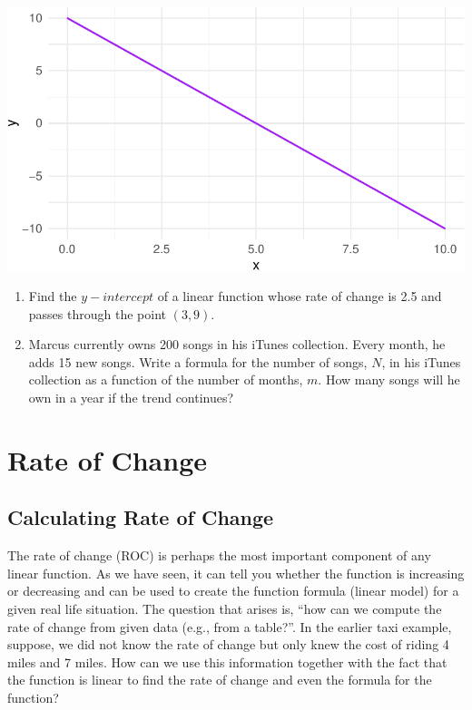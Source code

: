 \documentclass[
  letterpaper,
  DIV=11,
  numbers=noendperiod]{scrreprt}
\begin{document}
\includegraphics{Intro_LF_files/figure-pdf/unnamed-chunk-2-1.pdf}

\begin{enumerate}
\def\labelenumi{\arabic{enumi}.}
\setcounter{enumi}{5}
\item
  Find the \(y-intercept\) of a linear function whose rate of change is
  2.5 and passes through the point \((3,9)\).
\item
  Marcus currently owns 200 songs in his iTunes collection. Every month,
  he adds 15 new songs. Write a formula for the number of songs, \(N\),
  in his iTunes collection as a function of the number of months, \(m\).
  How many songs will he own in a year if the trend continues?
\end{enumerate}

\hypertarget{rate-of-change}{%
\chapter{Rate of Change}\label{rate-of-change}}

\hypertarget{calculating-rate-of-change}{%
\section{Calculating Rate of Change}\label{calculating-rate-of-change}}

The rate of change (ROC) is perhaps the most important component of any
linear function. As we have seen, it can tell you whether the function
is increasing or decreasing and can be used to create the function
formula (linear model) for a given real life situation. The question
that arises is, ``how can we compute the rate of change from given data
(e.g., from a table?''. In the earlier taxi example, suppose, we did not
know the rate of change but only knew the cost of riding 4 miles and 7
miles. How can we use this information together with the fact that the
function is linear to find the rate of change and even the formula for
the function?
\end{document}
